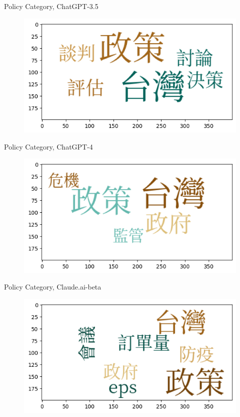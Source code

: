 \documentclass[12pt]{beamer}
\begin{document}
\begin{frame}{Policy Category, ChatGPT-3.5}
\begin{figure}[H]
\centering
\includegraphics[width=11.5cm]{Figures/fig4.png}
\end{figure}
\end{frame}


\begin{frame}{Policy Category, ChatGPT-4}
\begin{figure}[H]
\centering
\includegraphics[width=11.5cm]{Figures/fig5.png}
\end{figure}
\end{frame}


\begin{frame}{Policy Category, Claude.ai-beta}
\begin{figure}[H]
\centering
\includegraphics[width=11.5cm]{Figures/fig6.png}
\end{figure}
\end{frame}
\end{document}
